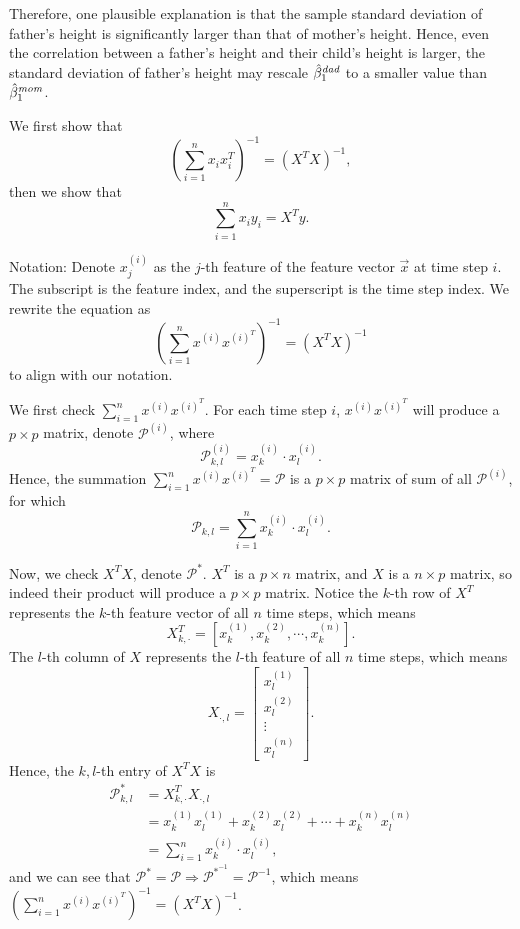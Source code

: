 \documentclass{article}
\begin{document}
Therefore, one plausible explanation is that the sample standard deviation of father's height is 
significantly larger than that of mother's height. Hence, even the correlation between 
a father's height and their child's height is larger, the standard deviation of father's height 
may rescale $\hat{\beta}_1^{\emph{dad}}$ to a smaller value than $\hat{\beta}_1^{\emph{mom}}$.


We first show that $$\left(\sum_{i=1}^{n}x_ix_i^T\right)^{-1} = \left(X^TX\right)^{-1},$$
then we show that $$\sum_{i=1}^{n}x_iy_i = X^Ty.$$

Notation: Denote $x_j^{(i)}$ as the $j$-th feature of the feature vector $\vec{x}$ at time step $i$. The 
subscript is the feature index, and the superscript is the time step index.
We rewrite the equation as $$\left(\sum_{i=1}^{n}x^{(i)}x^{(i)^T}\right)^{-1} = \left(X^TX\right)^{-1}$$ to align with our notation.

We first check $\sum_{i=1}^{n}x^{(i)}x^{(i)^T}$. For each time step $i$, $x^{(i)}x^{(i)^T}$ will produce a $p\times p$ matrix, denote $\mathcal{P}^{(i)}$, 
where $$\mathcal{P}_{k,l}^{(i)} = x_k^{(i)}\cdot x_l^{(i)}.$$ Hence, the summation 
$\sum_{i=1}^{n}x^{(i)}x^{(i)^T} = \mathcal{P}$ is a $p\times p$ matrix of sum of all $\mathcal{P}^{(i)}$, for which 
$$\mathcal{P}_{k,l} = \sum_{i=1}^{n}x_k^{(i)}\cdot x_l^{(i)}.$$

Now, we check $X^TX$, denote $\mathcal{P}^*$. $X^T$ is a $p\times n$ matrix, and $X$ is a $n\times p$ matrix, so indeed their 
product will produce a $p\times p$ matrix. Notice the $k$-th row of $X^T$ represents the $k$-th feature vector of all $n$ time steps, which means 
$$X^T_{k,\cdot} = \left[x_k^{(1)}, x_k^{(2)}, \cdots, x_k^{(n)}\right].$$
The $l$-th column of $X$ represents the $l$-th feature of all $n$ time steps, which means
$$X_{\cdot,l} = \begin{bmatrix}
    x_{l}^{(1)} \\
    x_{l}^{(2)} \\
    \vdots \\
    x_{l}^{(n)}
  \end{bmatrix}.$$
Hence, the $k,l$-th entry of $X^TX$ is
\begin{align*}
    \mathcal{P}^*_{k,l} & = X^T_{k,\cdot}X_{\cdot,l} \\
    & = x_k^{(1)}x_l^{(1)} + x_k^{(2)}x_l^{(2)} + \cdots + x_k^{(n)}x_l^{(n)} \\
    & = \sum_{i=1}^{n}x_k^{(i)}\cdot x_l^{(i)},
\end{align*}
and we can see that $\mathcal{P}^* = \mathcal{P}\Rightarrow\mathcal{P}^{*^{-1}} = \mathcal{P}^{-1}$, 
which means $\left(\sum_{i=1}^{n}x^{(i)}x^{(i)^T}\right)^{-1} = \left(X^TX\right)^{-1}$.
\end{document}

